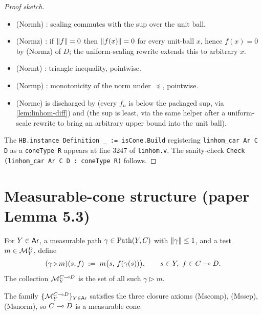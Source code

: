\begin{proof}[Proof sketch]
\begin{itemize}
\item (Normh) : scaling
  commutes with the sup over the unit ball.
\item (Normz) : if
  $\lVert f \rVert = 0$ then $\lVert f(x) \rVert = 0$ for every unit-ball $x$,
  hence $f(x) = 0$ by (Normz) of $D$; the uniform-scaling rewrite
  extends this to arbitrary $x$.
\item (Normt) : triangle
  inequality, pointwise.
\item (Normp) : monotonicity
  of the norm under $\preceq$, pointwise.
\item (Normc) is discharged by
   (every $f_n$ is
  below the packaged sup, via \autoref{lem:linhom-diff}) and
   (the sup is
  least, via the same helper after a uniform-scale rewrite to
  bring an arbitrary upper bound into the unit ball).
\end{itemize}
The \texttt{HB.instance Definition \_ := isCone.Build} registering
\texttt{linhom\_car Ar C D} as a \texttt{coneType R} appears at line
3247 of \texttt{linhom.v}. The sanity-check
\verb|Check (linhom_car Ar C D : coneType R)| follows.
\end{proof}

\section{Measurable-cone structure (paper Lemma 5.3)}%
\label{sec:linhom-mcone}

\begin{definition}\label{def:linhom-test}
\rocqok
{}
For $Y \in \mathsf{Ar}$, a measurable path
$\gamma \in \mathrm{Path}(Y, C)$ with $\lVert \gamma \rVert \le 1$, and a test
$m \in \mathcal{M}_Y^D$, define
\[
  (\gamma \triangleright m)(s, f)
  \;:=\; m\bigl(s,\,f(\gamma(s))\bigr),
  \qquad s \in Y,\ f \in C \multimap D.
\]
The collection $\mathcal{M}_Y^{C \multimap D}$ is the set of all such
$\gamma \triangleright m$.
\end{definition}

\begin{lemma}
\label{lem:linhom-mcone}
\rocqok
{}
The family $\{\mathcal{M}_Y^{C \multimap D}\}_{Y \in \mathsf{Ar}}$ satisfies the three
closure axioms (Mscomp), (Mssep), (Msnorm), so $C \multimap D$ is a
measurable cone.
\end{lemma}

